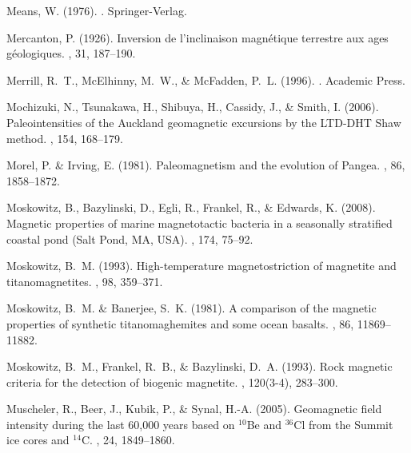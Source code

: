 \documentclass[11pt]{book}
\begin{document}
\begin{thebibliography}{}
Means, W. (1976).
.
\newblock Springer-Verlag.

Mercanton, P. (1926).
\newblock Inversion de l'inclinaison magn\'etique terrestre aux ages
  g\'eologiques.
, 31, 187--190.

Merrill, R.~T., McElhinny, M.~W., \& McFadden, P.~L. (1996).
.
\newblock Academic Press.

Mochizuki, N., Tsunakawa, H., Shibuya, H., Cassidy, J., \& Smith, I. (2006).
\newblock Paleointensities of the Auckland geomagnetic excursions by the
  LTD-DHT Shaw method.
, 154, 168--179.

Morel, P. \& Irving, E. (1981).
\newblock Paleomagnetism and the evolution of Pangea.
, 86, 1858--1872.

Moskowitz, B., Bazylinski, D., Egli, R., Frankel, R., \& Edwards, K. (2008).
\newblock Magnetic properties of marine magnetotactic bacteria in a seasonally
  stratified coastal pond (Salt Pond, MA, USA).
, 174, 75--92.

Moskowitz, B.~M. (1993).
\newblock High-temperature magnetostriction of magnetite and titanomagnetites.
, 98, 359--371.

Moskowitz, B.~M. \& Banerjee, S.~K. (1981).
\newblock A comparison of the magnetic properties of synthetic titanomaghemites
  and some ocean basalts.
, 86, 11869--11882.

Moskowitz, B.~M., Frankel, R.~B., \& Bazylinski, D.~A. (1993).
\newblock Rock magnetic criteria for the detection of biogenic magnetite.
, 120(3-4), 283--300.

Muscheler, R., Beer, J., Kubik, P., \& Synal, H.-A. (2005).
\newblock Geomagnetic field intensity during the last 60,000 years based on
  $^{10}$Be and $^{36}$Cl from the Summit ice cores and $^{14}$C.
, 24, 1849--1860.


\end{thebibliography}
\end{document}
